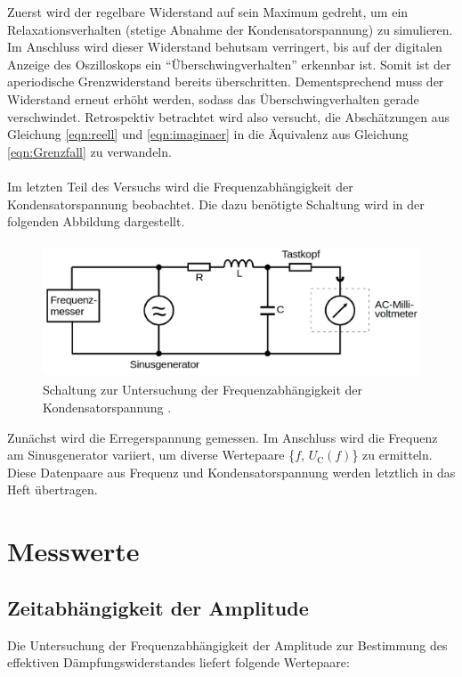 \noindent Zuerst wird der regelbare Widerstand auf sein Maximum gedreht, um ein Relaxationsverhalten (stetige Abnahme der
Kondensatorspannung) zu simulieren. Im Anschluss wird dieser Widerstand behutsam verringert, bis auf der digitalen Anzeige 
des Oszilloskops ein \enquote{Überschwingverhalten} erkennbar ist. Somit ist der aperiodische Grenzwiderstand bereits überschritten.
Dementsprechend muss der Widerstand erneut erhöht werden, sodass das Überschwingverhalten gerade verschwindet. Retrospektiv 
betrachtet wird also versucht, die Abschätzungen aus Gleichung \eqref{eqn:reell} und \eqref{eqn:imaginaer} in die Äquivalenz 
aus Gleichung \eqref{eqn:Grenzfall} zu verwandeln.\\\\

\noindent Im letzten Teil des Versuchs wird die Frequenzabhängigkeit der Kondensatorspannung beobachtet. Die dazu 
benötigte Schaltung wird in der folgenden Abbildung dargestellt.

\begin{figure}[H]
    \centering
    \includegraphics[height=4cm]{./content/5c.png}
    \caption{Schaltung zur Untersuchung der Frequenzabhängigkeit der Kondensatorspannung \cite{Versuchsanleitung_v354}.}
    \label{fig:5c}
\end{figure}

\noindent Zunächst wird die Erregerspannung gemessen. Im Anschluss wird die Frequenz am Sinusgenerator variiert, um 
diverse Wertepaare \{$f$, $U_\text{C}(f)$\} zu ermitteln. Diese Datenpaare aus Frequenz und Kondensatorspannung werden letztlich in 
das Heft übertragen.

\section{Messwerte}

\subsection{Zeitabhängigkeit der Amplitude}

Die Untersuchung der Frequenzabhängigkeit der Amplitude zur Bestimmung des effektiven Dämpfungswiderstandes liefert
folgende Wertepaare:


